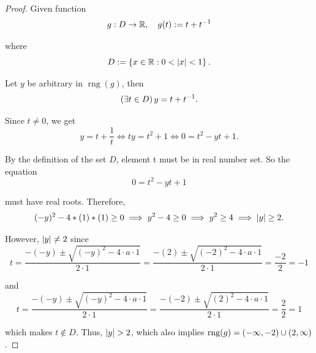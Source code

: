 \newpage
\subsubsection{}
\begin{proof}
    Given function
    \begin{equation*}
        g: D \to \mathbb{R}, \quad g(t) := t + t^{-1}
    \end{equation*}
    
    where 
    \begin{equation*}
        D := \left\{x \in \mathbb{R} : 0 < \left|x \right| < 1\right\}. 
    \end{equation*}

    Let $y$ be arbitrary in $\operatorname{rng}(g)$, then 
    \begin{equation*}
        \left(\exists t \in D\right)y = t + t^{-1}. 
    \end{equation*}

    Since $t \neq 0$, we get 
    \begin{equation*}
         y = t + \frac{1}{t} \iff ty = t^2 + 1 \iff 0 = t^2 - yt + 1. 
    \end{equation*}

    By the definition of the set $D$, element t must be in real number set. So the equation
    \begin{equation*}
        0 = t^2 - yt + 1
    \end{equation*}

    must have real roots. Therefore, 
    \begin{equation*}
        (-y)^2 - 4*(1)*(1) \geq 0 \implies y^2 - 4 \geq 0 \implies y^2 \geq 4 \implies \left|y\right| \geq 2. 
    \end{equation*}

    However, $\left|y\right| \neq 2$ since 
    \begin{equation*}
        t = \frac{-(-y) \pm \sqrt{(-y)^2 - 4 \cdot a \cdot 1}}{2 \cdot 1} = \frac{-(2) \pm \sqrt{(-2)^2 - 4 \cdot a \cdot 1}}{2 \cdot 1} = \frac{-2}{2} = -1
    \end{equation*}

    and 
     \begin{equation*}
        t = \frac{-(-y) \pm \sqrt{(-y)^2 - 4 \cdot a \cdot 1}}{2 \cdot 1} = \frac{-(-2) \pm \sqrt{(2)^2 - 4 \cdot a \cdot 1}}{2 \cdot 1} = \frac{2}{2} = 1
    \end{equation*}

    which makes $t \notin D$. 
    Thus, $\left|y\right| > 2$, which also implies $\operatorname{rng}(g) = \left(-\infty, -2\right) \cup \left(2, \infty\right)$.


\end{proof}
